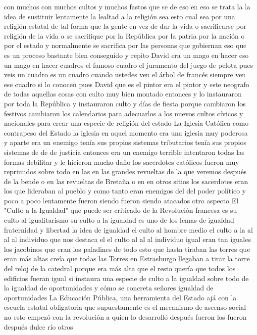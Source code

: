 con muchos con muchos cultos y muchos fastos que se de eso en eso se trata la la idea
de sustituir lentamente la lealtad a la religión sea esto cual sea por una religión estatal
de tal forma que la gente en vez de dar la vida o sacrificarse por religión de la vida o se sacrifique por la República
por la patria por la nación o por el estado y normalmente se sacrifica por las personas que gobiernan eso
que es un proceso bastante bien conseguido y repito David era un mago en hacer eso un mago en hacer cuadros el famoso cuadro el juramento
del juego de pelota pues veis un cuadro es un cuadro cuando ustedes ven el árbol de francés siempre ven ese cuadro
si lo conocen pues David que es el pintor era el pintor y este neografo de todas aquellas
cosas con culto muy bien montado entonces y lo instauraron por toda la República y instauraron culto y días de fiesta
porque cambiaron los festivos cambiaron los calendarios para adecuarlos a los nuevos cultos cívicos y nacionales
para crear una especie de religión del estado
La Iglesia Católica como contrapeso del Estado
la iglesia en aquel momento era una iglesia muy poderosa y aparte era un enemigo tenía sus propios sistemas tributarios
tenía sus propios sistemas de de de justicia entonces era un enemigo terrible intentaron
todas las formas debilitar y le hicieron mucho daño los sacerdotes católicos fueron muy reprimidos
sobre todo en las en las grandes revueltas de la que veremos después de la bende o en las revueltas de Bretaña o en en otros sitios
los sacerdotes eran los que lideraban al pueblo y como tanto eran enemigos del del poder político y poco a poco
lentamente fueron siendo fueron siendo atacados otro aspecto
El "Culto a la Igualdad"
que puede ser criticado de la Revolución francesa es su
culto al igualitarismo su culto a la igualdad es uno de los lemas de igualdad fraternidad y libertad
la idea de igualdad el culto al hombre medio el culto a la al al al individuo que nos destaca
el el culto al al al individuo igual eran tan iguales los jacobinos que eran los paladines de todo esto
que hasta tiraban las torres que eran más altas creía que todas las Torres en Estrasburgo llegaban a tirar la torre del reloj de la catedral
porque era más alta que el resto quería que todos los edificios fueran igual si instaura una especie de culto a la igualdad
sobre todo de la igualdad de oportunidades y cómo se concreta señores igualdad de oportunidades
La Educación Pública, una herramienta del Estado
ajá con la escuela estatal obligatoria que supuestamente es el mecanismo de ascenso social no
esto empezó con la revolución a quien lo desarrolló después fueron los fueron después dulce río otros
